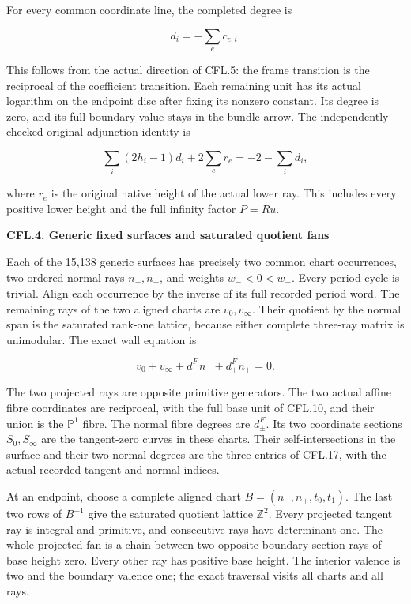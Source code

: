 For every common coordinate line, the completed degree is

\[
                         d_i=-\sum_e c_{e,i}.
 \tag{CFL.17}
\]

This follows from the actual direction of CFL.5: the frame
transition is the reciprocal of the coefficient transition.
Each remaining unit has its actual logarithm on the endpoint
disc after fixing its nonzero constant. Its degree is zero,
and its full boundary value stays in the bundle arrow.
The independently checked original adjunction identity is

\[
 \sum_i(2h_i-1)d_i+2\sum_e r_e=-2-\sum_i d_i,
 \tag{CFL.18}
\]

where \(r_e\) is the original native height of the actual
lower ray. This includes every positive lower height and
the full infinity factor \(P=Ru\).

\par

\medskip\noindent\textbf{CFL.4. Generic fixed surfaces and saturated quotient fans}

\par\nobreak

Each of the 15,138 generic surfaces has precisely two common
chart occurrences, two ordered normal rays \(n_-,n_+\), and
weights \(w_-<0<w_+\). Every period cycle is trivial.
Align each occurrence by the inverse of its full recorded
period word. The remaining rays of the two aligned charts
are \(v_0,v_\infty\). Their quotient by the normal span is
the saturated rank-one lattice, because either complete
three-ray matrix is unimodular. The exact wall equation is

\[
 v_0+v_\infty+d_-^Fn_-+d_+^Fn_+=0.
 \tag{CFL.19}
\]

The two projected rays are opposite primitive generators.
The two actual affine fibre coordinates are reciprocal,
with the full base unit of CFL.10, and their union is the
\(\mathbb P^1\) fibre. The normal fibre degrees are
\(d_\pm^F\). Its two coordinate sections \(S_0,S_\infty\)
are the tangent-zero curves in these charts. Their
self-intersections in the surface and their two normal
degrees are the three entries of CFL.17, with the actual
recorded tangent and normal indices.

At an endpoint, choose a complete aligned chart
\(B=(n_-,n_+,t_0,t_1)\). The last two rows of \(B^{-1}\)
give the saturated quotient lattice \(\mathbb Z^2\).
Every projected tangent ray is integral and primitive,
and consecutive rays have determinant one. The whole
projected fan is a chain between two opposite boundary
section rays of base height zero. Every other ray has
positive base height. The interior valence is two and
the boundary valence one; the exact traversal visits
all charts and all rays.

